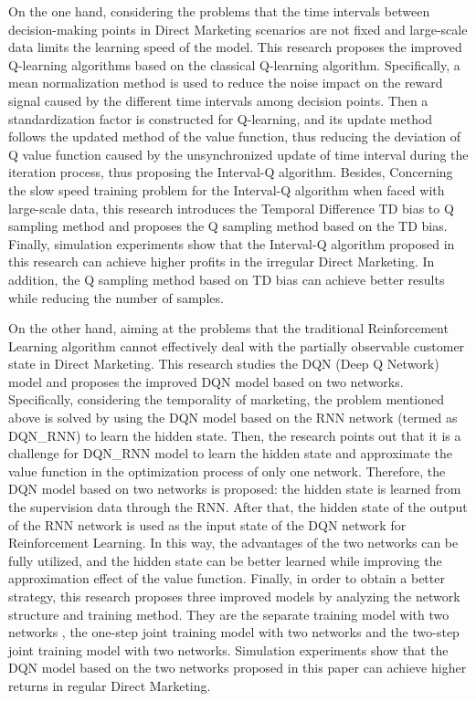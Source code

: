 \begin{enabstract}
On the one hand, considering the problems that the time intervals between decision-making points in Direct Marketing scenarios are not fixed and large-scale data limits the learning speed of the model. This research proposes the improved Q-learning algorithms based on the classical Q-learning algorithm. Specifically, a mean normalization method is used to reduce the noise impact on the reward signal caused by the different time intervals among decision points. Then a standardization factor is constructed for Q-learning, and its update method follows the updated method of the value function, thus reducing the deviation of Q value function caused by the unsynchronized update of time interval during the iteration process, thus proposing the Interval-Q algorithm. Besides, Concerning the slow speed training problem for the Interval-Q algorithm when faced with large-scale data, this research introduces the Temporal Difference TD bias to Q sampling method and proposes the Q sampling method based on the TD bias. Finally, simulation experiments show that the Interval-Q algorithm proposed in this research can achieve higher profits in the irregular Direct Marketing. In addition, the Q sampling method based on TD bias can achieve better results while reducing the number of samples.

On the other hand, aiming at the problems that the traditional Reinforcement Learning algorithm cannot effectively deal with the partially observable customer state in Direct Marketing. This research studies the DQN (Deep Q Network) model and proposes the improved DQN model based on two networks. Specifically,  considering the temporality of marketing, the problem mentioned above is solved by using the DQN model based on the RNN network (termed as DQN_RNN) to learn the hidden state. Then, the research points out that it is a challenge for DQN_RNN model to learn the hidden state and approximate the value function in the optimization process of only one network. Therefore, the DQN model based on two networks is proposed: the hidden state is learned from the supervision data through the RNN. After that, the hidden state of the output of the RNN network is used as the input state of the DQN network for Reinforcement Learning. In this way, the advantages of the two networks can be fully utilized, and the hidden state can be better learned while improving the approximation effect of the value function. Finally, in order to obtain a better strategy, this research proposes three improved models by analyzing the network structure and training method. They are the separate training model with two networks , the one-step joint training model with two networks and the two-step joint training model with two networks. Simulation experiments show that the DQN model based on the two networks proposed in this paper can achieve higher returns in regular Direct Marketing.


\end{enabstract}